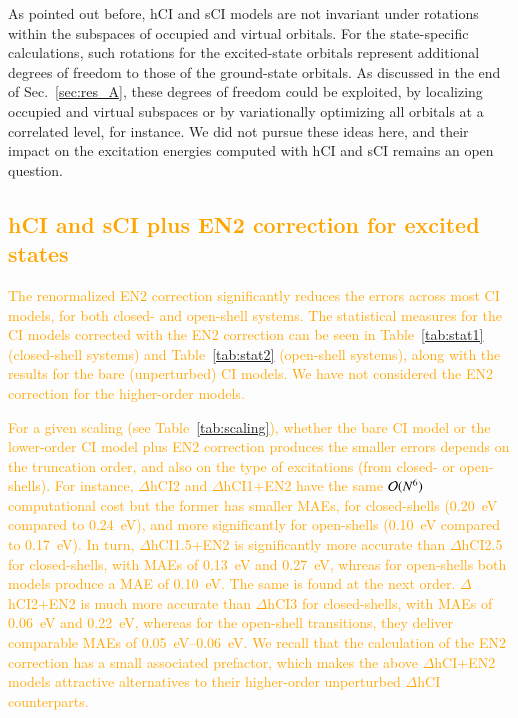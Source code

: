 \documentclass[aip,jcp,reprint,noshowkeys,superscriptaddress]{revtex4-1}
\newcommand{\fk}[1]{\textcolor{orange}{#1}}
\begin{document}
As pointed out before, hCI and sCI models are not invariant under rotations within the subspaces of occupied and virtual orbitals.
For the state-specific calculations, such rotations for the excited-state orbitals represent additional degrees of freedom to those of the ground-state orbitals. \cite{Kossoski_2022}
As discussed in the end of Sec.~\ref{sec:res_A}, these degrees of freedom could be exploited,
by localizing occupied and virtual subspaces or by variationally optimizing all orbitals at a correlated level, for instance.
We did not pursue these ideas here, and their impact on the excitation energies computed with hCI and sCI remains an open question.

\subsection{\fk{hCI and sCI plus EN2 correction for excited states}}
\label{sec:res_E}

\fk{
The renormalized EN2 correction significantly reduces the errors across most CI models, for both closed- and open-shell systems.
The statistical measures for the CI models corrected with the EN2 correction can be seen in
Table~\ref{tab:stat1} (closed-shell systems) and Table~\ref{tab:stat2} (open-shell systems),
along with the results for the bare (unperturbed) CI models.
We have not considered the EN2 correction for the higher-order models.
}

\fk{
For a given scaling (see Table~\ref{tab:scaling}), whether the bare CI model or the lower-order CI model plus EN2 correction produces the smaller errors depends on the truncation order,
and also on the type of excitations (from closed- or open-shells).
For instance, $\Delta$hCI2 and $\Delta$hCI1+EN2 have the same $\order*{N^6}$ computational cost
but the former has smaller MAEs, for closed-shells (\SI{0.20}{\eV} compared to \SI{0.24}{\eV}), and more significantly for open-shells (\SI{0.10}{\eV} compared to \SI{0.17}{\eV}).
In turn, $\Delta$hCI1.5+EN2 is significantly more accurate than $\Delta$hCI2.5 for closed-shells,
with MAEs of \SI{0.13}{\eV} and \SI{0.27}{\eV}, whreas for open-shells both models produce a MAE of \SI{0.10}{\eV}.
The same is found at the next order.
$\Delta$hCI2+EN2 is much more accurate than $\Delta$hCI3 for closed-shells, with MAEs of \SI{0.06}{\eV} and \SI{0.22}{\eV},
whereas for the open-shell transitions, they deliver comparable MAEs of \SIrange{0.05}{0.06}{\eV}.
We recall that the calculation of the EN2 correction has a small associated prefactor, which makes the above $\Delta$hCI+EN2 models attractive alternatives to their higher-order unperturbed $\Delta$hCI counterparts.
}
\end{document}
